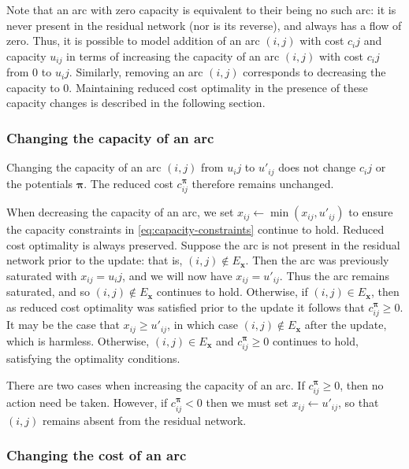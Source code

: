Note that an arc with zero capacity is equivalent to their being no such arc: it is never present in the residual network (nor is its reverse), and always has a flow of zero. Thus, it is possible to model addition of an arc $(i,j)$ with cost $c_ij$ and capacity $u_{ij}$ in terms of increasing the capacity of an arc $(i,j)$ with cost $c_ij$ from $0$ to $u_ij$. Similarly, removing an arc $(i,j)$ corresponds to decreasing the capacity to $0$. Maintaining reduced cost optimality in the presence of these capacity changes is described in the following section.

\subsubsection{Changing the capacity of an arc}

Changing the capacity of an arc $(i,j)$ from $u_ij$ to $u'_{ij}$ does not change $c_ij$ or the potentials $\boldsymbol{\pi}$. The reduced cost $c_{ij}^{\boldsymbol{\pi}}$ therefore remains unchanged.

When decreasing the capacity of an arc, we set $x_{ij} \gets \min\left(x_{ij},u'_{ij}\right)$ to ensure the capacity constraints in \cref{eq:capacity-constraints} continue to hold\footnotemark. Reduced cost optimality is always preserved. Suppose the arc is not present in the residual network prior to the update: that is, $(i,j) \not \in E_\mathbf{x}$. Then the arc was previously saturated with $x_{ij} = u_ij$, and we will now have $x_{ij} = u'_{ij}$. Thus the arc remains saturated, and so $(i,j) \not \in E_\mathbf{x}$ continues to hold. Otherwise, if $(i,j) \in E_\mathbf{x}$, then as reduced cost optimality was satisfied prior to the update it follows that $c_{ij}^{\boldsymbol{\pi}} \geq 0$. It may be the case that $x_{ij} \geq u'_{ij}$, in which case $(i,j) \not \in E_\mathbf{x}$ after the update, which is harmless. Otherwise, $(i,j) \in E_\mathbf{x}$ and $c_{ij}^{\boldsymbol{\pi}} \geq 0$ continues to hold, satisfying the optimality conditions.

There are two cases when increasing the capacity of an arc. If $c_{ij}^{\boldsymbol{\pi}} \geq 0$, then no action need be taken. However, if $c_{ij}^{\boldsymbol{\pi}} < 0$ then we must set $x_{ij} \gets u'_{ij}$, so that $(i,j)$ remains absent from the residual network.

\subsubsection{Changing the cost of an arc}

